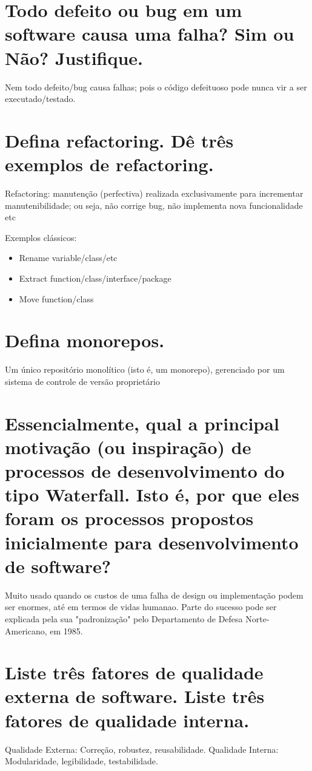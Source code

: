 \documentclass[11pt]{article}
\begin{document}
\section{Todo defeito ou bug em um software causa uma falha? Sim ou Não? Justifique.}
\label{sec:org7a30b57}
Nem todo defeito/bug causa falhas; pois o código defeituoso pode nunca vir a ser executado/testado.
\section{Defina refactoring. Dê três exemplos de refactoring.}
\label{sec:org01c5098}
Refactoring: manutenção (perfectiva) realizada exclusivamente para incrementar
manutenibilidade; ou seja, não corrige bug, não implementa nova funcionalidade etc

Exemplos clássicos:
\begin{itemize}
\item Rename variable/class/etc
\item Extract function/class/interface/package
\item Move function/class
\end{itemize}
\section{Defina monorepos.}
\label{sec:orgb23b962}
Um único repositório monolítico (isto é, um monorepo), gerenciado por um sistema de
controle de versão proprietário

\section{Essencialmente, qual a principal motivação (ou inspiração) de processos de desenvolvimento do tipo Waterfall. Isto é, por que eles foram os processos propostos inicialmente para desenvolvimento de software?}
\label{sec:org9f4732f}
Muito usado quando os custos de uma falha de design ou implementação podem ser enormes,
até em termos de vidas humanao. Parte do sucesso pode ser explicada pela sua
"padronização" pelo Departamento de Defesa Norte-Americano, em 1985.

\section{Liste três fatores de qualidade externa de software. Liste três fatores de qualidade interna.}
\label{sec:org166b467}
Qualidade Externa: Correção, robustez, reusabilidade.
Qualidade Interna: Modularidade, legibilidade, testabilidade.  
\end{document}
